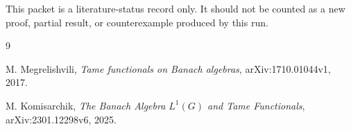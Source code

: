 \documentclass[11pt]{article}
\begin{document}
This packet is a literature-status record only.  It should not be counted as a
new proof, partial result, or counterexample produced by this run.

\begin{thebibliography}{9}

M. Megrelishvili,
\emph{Tame functionals on Banach algebras},
arXiv:1710.01044v1, 2017.

M. Komisarchik,
\emph{The Banach Algebra \(L^1(G)\) and Tame Functionals},
arXiv:2301.12298v6, 2025.

\end{thebibliography}
\end{document}
